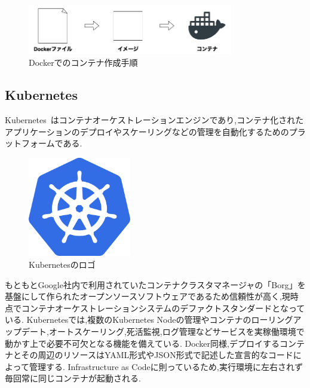 \begin{figure}[htbp]
\begin{center}
    \includegraphics[width=0.8\textwidth]{./figures/docker-process.jpg}
    \caption{Dockerでのコンテナ作成手順}
\end{center}
\end{figure}

\subsection{Kubernetes}
\label{background:container-orchestration-system:kubernetes}

Kubernetes~\cite{Kubernetes}はコンテナオーケストレーションエンジンであり,コンテナ化されたアプリケーションのデプロイやスケーリングなどの管理を自動化するためのプラットフォームである.

\begin{figure}[htbp]
\begin{center}
    \includegraphics[width=0.4\textwidth]{./figures/kubernetes_logo.png}
    \caption{Kubernetesのロゴ}
\end{center}
\end{figure}

もともとGoogle社内で利用されていたコンテナクラスタマネージャの「Borg」を基盤にして作られたオープンソースソフトウェアであるため信頼性が高く,現時点でコンテナオーケストレーションシステムのデファクトスタンダードとなっている.
Kubernetesでは,複数のKubernetes Nodeの管理やコンテナのローリングアップデート,オートスケーリング,死活監視,ログ管理などサービスを実稼働環境で動かす上で必要不可欠となる機能を備えている.
Docker同様,デプロイするコンテナとその周辺のリソースはYAML形式やJSON形式で記述した宣言的なコードによって管理する.
Infrastructure as Codeに則っているため,実行環境に左右されず毎回常に同じコンテナが起動される.

